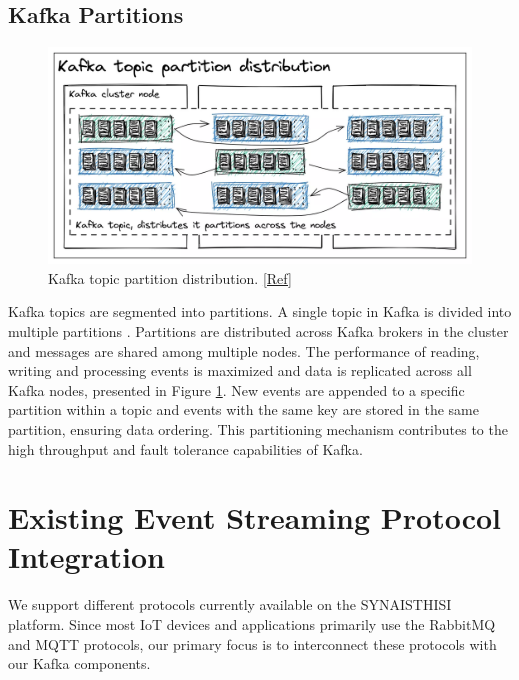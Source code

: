\subsection{Kafka Partitions}\label{kafka_partitions}

\begin{figure}[htbp]
	\includegraphics[width=0.75\linewidth]{figures/partition-distribution.jpg}
	\centering
	\caption{Kafka topic partition distribution. \href{https://trigodev.com/de-at/blog/kafka-topics-and-partitions}{[Ref]}}
	\label{PartitionDistribution}
\end{figure}

Kafka topics are segmented into partitions. A single topic in Kafka is divided into multiple partitions . Partitions are distributed across Kafka brokers in the cluster and messages are shared among multiple nodes. The performance of reading, writing and processing events is maximized and data is replicated across all Kafka nodes, presented in Figure \ref{PartitionDistribution}. New events are appended to a specific partition within a topic and events with the same key are stored in the same partition, ensuring data ordering. This partitioning mechanism contributes to the high throughput and fault tolerance capabilities of Kafka.

\section{Existing Event Streaming Protocol Integration}
We support different protocols currently available on the SYNAISTHISI platform. Since most IoT devices and applications primarily use the RabbitMQ and MQTT protocols, our primary focus is to interconnect these protocols with our Kafka components.
